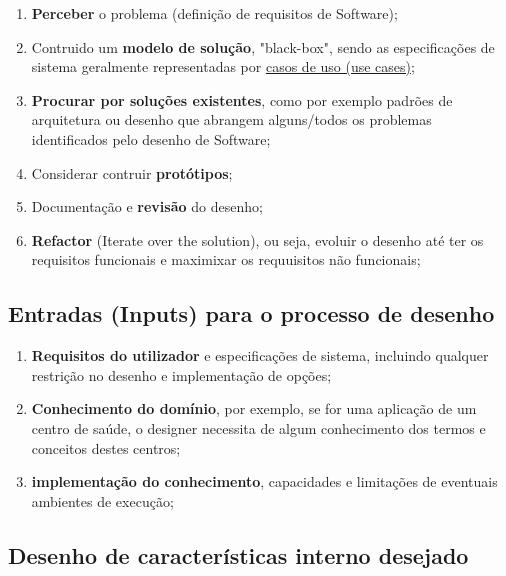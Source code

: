 \documentclass{article}
\begin{document}
\begin{enumerate}
    \item \textbf{Perceber} o problema (definição de requisitos de Software);
    \item Contruido um \textbf{modelo de solução}, "black-box", sendo as especificações
    de sistema geralmente representadas por \uline{casos de uso (use cases)};
    \item \textbf{Procurar por soluções existentes}, como por exemplo padrões de arquitetura ou desenho
    que abrangem alguns/todos os problemas identificados pelo desenho de Software;
    \item Considerar contruir \textbf{protótipos};
    \item Documentação e \textbf{revisão} do desenho;
    \item \textbf{Refactor} (Iterate over the solution), ou seja, evoluir o desenho até
    ter os requisitos funcionais e maximixar os requuisitos não funcionais;
\end{enumerate}

\pagebreak

\subsection{Entradas (Inputs) para o processo de desenho}

\begin{enumerate}
    \item \textbf{Requisitos do utilizador} e especificações de sistema, incluindo qualquer restrição no desenho e implementação de opções;
    \item \textbf{Conhecimento do domínio}, por exemplo, se for uma aplicação de um centro de saúde, o designer necessita de algum conhecimento dos termos e conceitos destes centros;
    \item \textbf{implementação do conhecimento}, capacidades e limitações de eventuais ambientes de execução; 
\end{enumerate}

\subsection{Desenho de características interno desejado}
\end{document}
